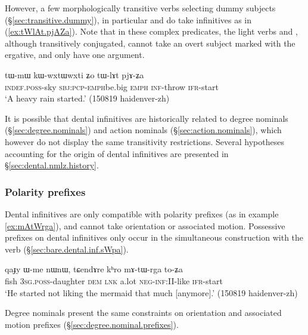 However, a few morphologically transitive verbs selecting dummy subjects (§\ref{sec:transitive.dummy}), in particular  and  do take  infinitives as in (\ref{ex:tWlAt.pjAZa}).  Note that in these complex predicates, the light verbs  and , although transitively conjugated, cannot take an overt subject marked with the ergative, and only have one argument.
 
\begin{exe}
\ex  \label{ex:tWlAt.pjAZa}
\gll tɯ-mɯ kɯ-wxtɯ\redp{}wxti ʑo tɯ-lɤt pjɤ-ʑa \\
\textsc{indef}.\textsc{poss}-sky \textsc{sbj}:\textsc{pcp}-\textsc{emph}\redp{}be.big \textsc{emph} \textsc{inf}-throw \textsc{ifr}-start \\
\glt `A heavy rain started.' (150819 haidenver-zh) 
\end{exe}

It is possible that dental infinitives are historically related to degree nominals (§\ref{sec:degree.nominals}) and action nominals (§\ref{sec:action.nominals}), which however do not display the same transitivity restrictions. Several hypotheses accounting for the origin of dental infinitives are presented in §\ref{sec:dental.nmlz.history}.

\subsubsection{Polarity prefixes} \label{sec:dental.inf.polarity}
Dental infinitives are only compatible with polarity prefixes (as in example \ref{ex:mAtWrga}), and cannot take orientation or associated motion. Possessive prefixes on dental infinitives only occur in the simultaneous construction with the verb  (§\ref{sec:bare.dental.inf.sWpa}).

\begin{exe}
\ex  \label{ex:mAtWrga}
\gll qaɟy ɯ-me nɯnɯ, tɕendɤre kʰro mɤ-tɯ-rga to-ʑa\\
fish \textsc{3sg}.\textsc{poss}-daughter \textsc{dem} \textsc{lnk} a.lot \textsc{neg}-\textsc{inf}:\textsc{II}-like \textsc{ifr}-start \\
\glt `He started not liking the mermaid that much [anymore].' (150819 haidenver-zh)
\end{exe}

Degree nominals present the same constraints on orientation and associated motion prefixes (§\ref{sec:degree.nominal.prefixes}).

